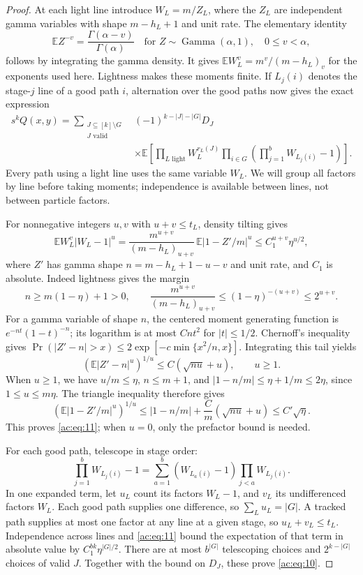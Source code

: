 \begin{proof}
At each light line introduce \(W_L=m/Z_L\), where the \(Z_L\) are independent
gamma variables with shape \(m-h_L+1\) and unit rate. The elementary identity
\[
 \mathbb E Z^{-v}=\frac{\Gamma(\alpha-v)}{\Gamma(\alpha)}
 \quad\text{for }Z\sim\operatorname{Gamma}(\alpha,1),\quad 0\le v<\alpha,
\]
follows by integrating the gamma density. It gives
\(\mathbb E W_L^v=m^v/(m-h_L)_v\) for the exponents used here. Lightness makes
these moments finite. If \(L_j(i)\) denotes the stage-\(j\) line of a good
path \(i\), alternation over the good paths now gives the exact expression
\[
\begin{split}
 s^kQ(x,y)
 =\sum_{\substack{J\subseteq[k]\setminus G\\J\text{ valid}}}
 &(-1)^{k-|J|-|G|}D_J\\
 &\times\mathbb E\!\left[
   \prod_{L\text{ light}}W_L^{r_L(J)}
   \prod_{i\in G}\left(\prod_{j=1}^bW_{L_j(i)}-1\right)\right].
\end{split}
\]
Every path using a light line uses the same variable \(W_L\). We will group all
factors by line before taking moments; independence is available between
lines, not between particle factors.

For nonnegative integers \(u,v\) with \(u+v\le t_L\), density tilting gives
\begin{equation}
 \mathbb E W_L^v|W_L-1|^u
 =\frac{m^{u+v}}{(m-h_L)_{u+v}}\,
       \mathbb E|1-Z'/m|^u
 \le C_1^{u+v}\eta^{u/2},
 \label{ac:eq:11}
\end{equation}
where \(Z'\) has gamma shape \(n=m-h_L+1-u-v\) and unit rate, and \(C_1\) is absolute.
Indeed lightness gives the margin
\[
 n\ge m(1-\eta)+1>0,\qquad
 \frac{m^{u+v}}{(m-h_L)_{u+v}}
 \le(1-\eta)^{-(u+v)}\le2^{u+v}.
\]
For a gamma variable of shape \(n\), the centered moment generating function
is \(e^{-nt}(1-t)^{-n}\); its logarithm is at most \(Cnt^2\) for
\(|t|\le1/2\). Chernoff's inequality gives
\(\Pr(|Z'-n|>x)\le2\exp[-c\min\{x^2/n,x\}]\). Integrating this tail yields
\[
 (\mathbb E|Z'-n|^u)^{1/u}\le C(\sqrt{nu}+u),\qquad u\ge1.
\]
When \(u\ge1\), we have \(u/m\le\eta\), \(n\le m+1\), and
\(\lvert1-n/m\rvert\le\eta+1/m\le2\eta\), since \(1\le u\le m\eta\).
The triangle inequality therefore gives
\[
 (\mathbb E|1-Z'/m|^u)^{1/u}
 \le |1-n/m|+\frac C m(\sqrt{nu}+u)
 \le C'\sqrt\eta.
\]
This proves \eqref{ac:eq:11}; when \(u=0\), only the prefactor bound is needed.

For each good path, telescope in stage order:
\[
 \prod_{j=1}^bW_{L_j(i)}-1
 =\sum_{a=1}^b (W_{L_a(i)}-1)\prod_{j<a}W_{L_j(i)}.
\]
In one expanded term, let \(u_L\) count its factors \(W_L-1\), and \(v_L\)
its undifferenced factors \(W_L\). Each good path supplies one difference,
so \(\sum_Lu_L=|G|\). A tracked path supplies at most one factor at any
line at a given stage, so \(u_L+v_L\le t_L\). Independence across lines and
\eqref{ac:eq:11} bound the expectation of that term in absolute value by
\(C_1^{bk}\eta^{|G|/2}\). There are at most \(b^{|G|}\) telescoping choices
and \(2^{k-|G|}\) choices of valid \(J\). Together with the bound on \(D_J\),
these prove \eqref{ac:eq:10}.


\end{proof}

